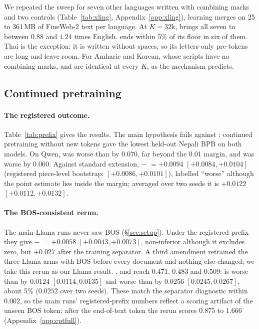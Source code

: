 We repeated the sweep for seven other languages written with combining marks and two controls (Table~\ref{tab:xling}, Appendix~\ref{app:xling}), learning merges on 25 to 361\,MB of FineWeb-2 text per language. At $K{=}32$k, \RII{} brings all seven to between $0.88$ and $1.24$ times English. \RI{} ends within 5\% of its floor in six of them. Thai is the exception: it is written without spaces, so its letters-only pre-tokens are long and leave \RI{} room. For Amharic and Korean, whose scripts have no combining marks, \RI{} and \RII{} are identical at every $K$, as the mechanism predicts.

\subsection{Continued pretraining}
\label{sec:cpt}

\paragraph{The registered outcome.} Table~\ref{tab:prefix} gives the results. The main hypothesis fails against \RO{}: continued pretraining without new tokens gave the lowest held-out Nepali BPB on both models. On Qwen, \RII{} was worse than \RO{} by $0.070$, far beyond the 0.01 margin, and \RI{} was worse by $0.060$. Against standard extension, \RII{} $-$ \RI{} $= +0.0094$ $[+0.0084, +0.0104]$ (registered piece-level bootstrap: $[+0.0086, +0.0101]$), labelled ``worse'' although the point estimate lies inside the margin; averaged over two seeds it is $+0.0122$ $[+0.0112, +0.0132]$.

\paragraph{The BOS-consistent rerun.} The main Llama runs never saw BOS (\S\ref{sec:setup}). Under the registered prefix they give \RII{} $-$ \RI{} $= +0.0058$ $[+0.0043, +0.0073]$, non-inferior although it excludes zero, but $+0.027$ after the training separator. A third amendment retrained the three Llama arms with BOS before every document and nothing else changed; we take this rerun as our Llama result. \RO{}, \RI{} and \RII{} reach $0.471$, $0.483$ and $0.509$: \RI{} is worse than \RO{} by $0.0124$ $[0.0114, 0.0135]$ and \RII{} worse than \RI{} by $0.0256$ $[0.0245, 0.0267]$, about 5\% ($0.0252$ over two seeds). These match the separator diagnostic within $0.002$, so the main runs' registered-prefix numbers reflect a scoring artifact of the unseen BOS token; after the end-of-text token the rerun scores $0.875$ to $1.666$ (Appendix~\ref{app:cptfull}).


